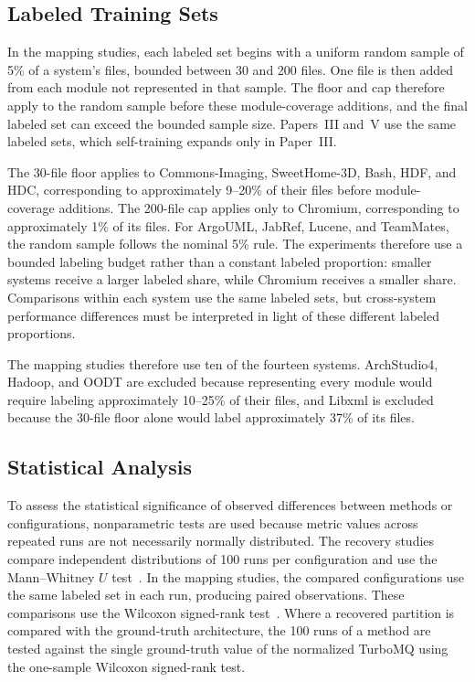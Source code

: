 \subsection{Labeled Training Sets}
In the mapping studies, each labeled set begins with a uniform random sample of 5\% of a system's files, bounded between 30 and 200 files. One file is then added from each module not represented in that sample. The floor and cap therefore apply to the random sample before these module-coverage additions, and the final labeled set can exceed the bounded sample size. Papers~III and~V use the same labeled sets, which self-training expands only in Paper~III.
 
The 30-file floor applies to Commons-Imaging, SweetHome-3D, Bash, HDF, and HDC, corresponding to approximately 9--20\% of their files before module-coverage additions. The 200-file cap applies only to Chromium, corresponding to approximately 1\% of its files. For ArgoUML, JabRef, Lucene, and TeamMates, the random sample follows the nominal 5\% rule. The experiments therefore use a bounded labeling budget rather than a constant labeled proportion: smaller systems receive a larger labeled share, while Chromium receives a smaller share. Comparisons within each system use the same labeled sets, but cross-system performance differences must be interpreted in light of these different labeled proportions.
 
The mapping studies therefore use ten of the fourteen systems. ArchStudio4, Hadoop, and OODT are excluded because representing every module would require labeling approximately 10--25\% of their files, and Libxml is excluded because the 30-file floor alone would label approximately 37\% of its files.

\subsection{Statistical Analysis \label{sec:stat_analysis}}

To assess the statistical significance of observed differences between methods or configurations, nonparametric tests are used because metric values across repeated runs are not necessarily normally distributed. The recovery studies compare independent distributions of 100 runs per configuration and use the Mann--Whitney $U$ test~\cite{mann}. In the mapping studies, the compared configurations use the same labeled set in each run, producing paired observations. These comparisons use the Wilcoxon signed-rank test~\cite{wilcoxon}. Where a recovered partition is compared with the ground-truth architecture, the 100 runs of a method are tested against the single ground-truth value of the normalized TurboMQ using the one-sample Wilcoxon signed-rank test.

